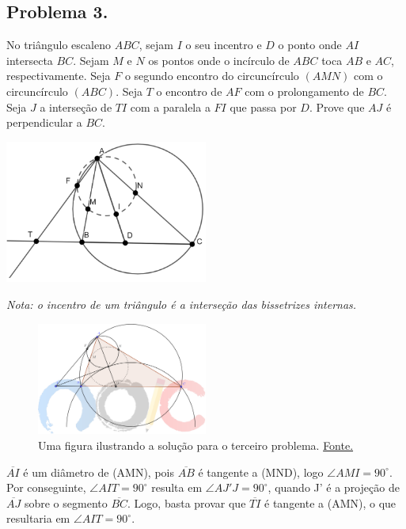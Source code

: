 \documentclass[12pt]{article}
\begin{document}
        \subsection{Problema 3.}
      \begin{tcolorbox}[problembox={Enunciado do problema}]
        No triângulo escaleno $ABC$, sejam $I$ o seu incentro e $D$ o ponto onde $AI$
        intersecta $BC$. Sejam $M$ e $N$ os pontos onde o incírculo de $ABC$ toca $AB$
        e $AC$, respectivamente. Seja $F$ o segundo encontro do circuncírculo $(AMN)$
        com o circuncírculo $(ABC)$. Seja $T$ o encontro de $AF$ com o prolongamento
        de $BC$. Seja $J$ a interseção de $TI$ com a paralela a $FI$ que passa por $D$.
        Prove que $AJ$ é perpendicular a $BC$.

        \centering
          \includegraphics[width=0.5\textwidth]{third.png}

        \textit{Nota: o incentro de um triângulo é a interseção das bissetrizes internas.}
      \end{tcolorbox}

      \begin{figure}[h]
        \centering
        \includegraphics[width=0.5\textwidth]{fourth.png}
        \caption{Uma figura ilustrando a solução para o terceiro problema. \href{https://noic.com.br/wp-content/uploads/2025/03/Solucoes_do_TM2_2024_Nivel_A.pdf}{Fonte.}}
      \end{figure}

      $\overline{AI}$ é um diâmetro de (AMN), pois $\overline{AB}$ é tangente a (MND), logo
      $\angle{AMI} = 90^{\circ}$. Por conseguinte, $\angle{AIT} = 90^{\circ}$ resulta em
      $\angle AJ'J = 90^{\circ}$, quando J' é a projeção de $\overline{AJ}$ sobre o segmento 
      $\overline{BC}$. Logo, basta provar que $\overline{TI}$ é tangente a (AMN), o que
      resultaria em $\angle{AIT} = 90^{\circ}$.
\end{document}
